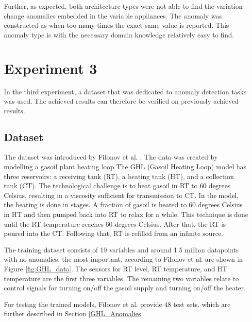 Further, as expected, both architecture types were not able to find the variation change anomalies embedded in the variable appliances. The anomaly was constructed as when too many times the exact same value is reported. This anomaly type is with the necessary domain knowledge relatively easy to find.

\section{Experiment 3}
In the third experiment, a dataset that was dedicated to anomaly detection tasks was used. The achieved results can therefore be verified on previously achieved results.

\subsection{Dataset} \label{GHL_Dataset}
The dataset was introduced by Filonov et al. \parencite{Filonov2016}. The data was created by modelling a gasoil plant heating loop The GHL (Gasoil Heating Loop) model has three reservoirs: a receiving tank (RT), a heating tank (HT), and a collection tank (CT). The technological challenge is to heat gasoil in RT to 60 degrees Celsius, resulting in a viscosity sufficient for transmission to CT. In the model, the heating is done in stages. A fraction of gasoil is heated to 60 degrees Celsius in HT and then pumped back into RT to relax for a while. This technique is done until the RT temperature reaches 60 degrees Celsius. After that, the RT is poured into the CT. Following that, RT is refilled from an infinite source.

The training dataset consists of 19 variables and around 1.5 million datapoints with no anomalies, the most important, according to Filonov et al. \parencite{Filonov2016} are shown in Figure \ref{fig:GHL_data}. The sensors for RT level, RT temperature, and HT temperature are the first three variables. The remaining two variables relate to control signals for turning on/off the gasoil supply and turning on/off the heater.

For testing the trained models, Filonov et al. \parencite*{Filonov2016} provide 48 test sets, which are further described in Section \ref{GHL_Anomalies}

